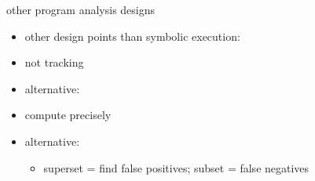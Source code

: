 \begin{frame}{other program analysis designs}
    \begin{itemize}
    \item other design points than symbolic execution:
    \vspace{.5cm}
    \item not tracking 
    \item alternative: 
    \vspace{.5cm}
    \item compute precisely 
    \item alternative: 
        \begin{itemize}
        \item superset = find false positives; subset = false negatives
        \end{itemize}
    \end{itemize}
\end{frame}
